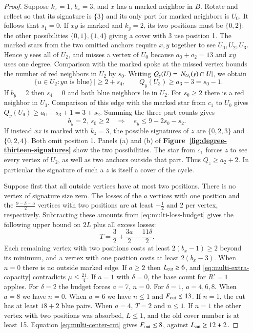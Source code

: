 \documentclass[preprint,11pt,numbers]{elsarticle-arxiv}
\numberwithin{equation}{section}
\theoremstyle{definition}
\begin{document}
\begin{proof}
Suppose $k_x=1$, $b_x=3$, and $x$ has a marked neighbor in $B$.
Rotate and reflect so that its signature is $\{3\}$ and its only part
for marked neighbors is $U_0$. It follows that $s_1=0$. If $xy$ is marked and
$k_y=2$, its two positions must be $\{0,2\}$: the other possibilities
$\{0,1\},\{1,4\}$ giving a cover with $3$ use position 1.
The marked stars from the two omitted anchors require $x,y$ together
to see $U_0,U_2,U_3$. Hence $y$ sees all of $U_2$, and misses a
vertex of $U_0$ because $a_0+a_2=13$ and $xy$ uses one degree.
Comparison with the marked spoke at the missed vertex bounds the
number of red neighbors in $U_2$ by $s_0$. Writing $Q_y(U)=
|N_{G_{\rm s}}(y)\cap U|$, we obtain
\begin{equation}\label{eq:d13-two-positions}
 |\,\{u\in U_2:yu\text{ is blue}\}\,|\ge2+s_4,\qquad
 Q_y(U_3)\ge a_3-3=s_0-1.
\end{equation}
If $b_y=2$ then $s_4=0$ and both blue neighbors lie in $U_2$.
For $s_0\ge2$ there is a red neighbor in $U_3$. Comparison of this
edge with the marked star from $c_1$ to $U_0$ gives
$Q_y(U_0)\ge a_0-s_3+1=3+s_2$. Summing the three part counts gives
\begin{equation}\label{eq:d13-outside-degree}
 b_y=2,\ s_0\ge2\quad\Longrightarrow\quad e_y\le9-2s_0-s_2 .
\end{equation}
If instead $xz$ is marked with $k_z=3$, the possible signatures
of $z$ are $\{0,2,3\}$ and $\{0,2,4\}$. Both omit position 1.
Panels (a) and (b) of \textbf{Figure~\ref{fig:degree-thirteen-signatures}}
show the two possibilities.
The star from $c_1$ forces $z$ to see every vertex of $U_2$, as
well as two anchors outside that part. Thus $Q_z\ge a_2+2$.
In particular the signature of such a $z$ is itself a cover of the cycle.

Suppose first that all outside vertices have at most two positions.
There is no vertex of signature size zero. The losses of the $a$
vertices with one position and the $\frac{9-\delta-a}{2}$ vertices with
two positions are at least $-\frac{1}{2}$ and 2 per vertex, respectively.
Subtracting these amounts from \eqref{eq:multi-loss-budget} gives
the following upper bound on $2L$ plus all excess losses:
\[
 T=\frac{3}{2}+\frac{3a}{2}-\frac{11\delta}{2}.
\]
Each remaining vertex with two positions costs at least
$2(b_x-1)\ge2$ beyond its minimum, and a vertex with one position
costs at least $2(b_x-3)$. When $n=0$ there is no outside marked
edge. If $a\ge2$ then $L_{\rm cut}\ge6$, and
\eqref{eq:multi-extra-capacity} contradicts $\mu\le\frac{21}{4}$. If $a=1$
with $\delta=0$, the base count for $R'=1$ applies.
For $\delta=2$ the budget forces $a=7$, $n=0$.
For $\delta=1$, $a=4,6,8$. When $a=8$ we have $n=0$. When $a=6$
we have $n\le1$ and $F_{\rm out}\le13$. If $n=1$, the cut
has at least $18+2$ blue pairs. When $a=4$, $T=2$ and $n\le1$.
If $n=1$ the other vertex with two positions was absorbed, $L\le1$,
and the old cover number is at least 15. Equation
\eqref{eq:multi-center-cut} gives $F_{\rm out}\le8$, against
$L_{\rm cut}\ge12+2$.


\end{proof}
\end{document}
